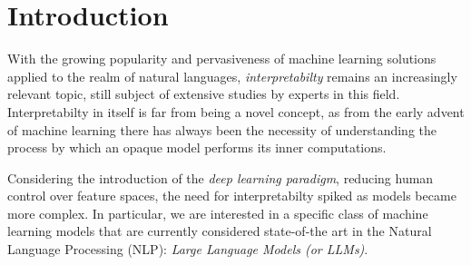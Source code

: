 \documentclass[11pt,a4paper,twocolumn]{article}
\begin{document}



\section{Introduction}\label{sec:introduction}

With the growing popularity and pervasiveness of machine learning solutions applied to the realm of natural languages, \emph{interpretabilty} remains an increasingly relevant topic, still subject of extensive studies by experts in this field.
Interpretabilty in itself is far from being a novel concept, as from the early advent of machine learning there has always been the necessity of understanding the process by which an opaque model performs its inner computations.

Considering the introduction of the \emph{deep learning paradigm}, reducing human control over feature spaces, the need for interpretabilty spiked as models became more complex.
In particular, we are interested in a specific class of machine learning models that are currently considered state-of-the art in the Natural Language Processing (NLP): \emph{Large Language Models (or LLMs)}.
\end{document}
